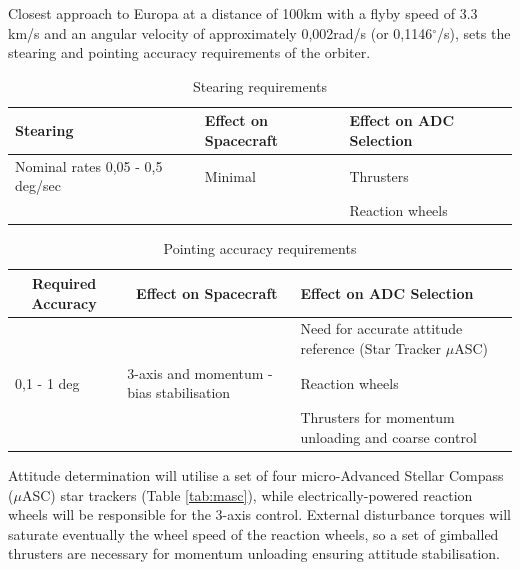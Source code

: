 Closest approach to Europa at a distance of 100km with a flyby speed of 3.3 km/s and an angular velocity of approximately 0,002rad/s (or 0,1146$^{\circ}$/s), sets the stearing and pointing accuracy requirements of the orbiter. 
\begin{table}[htb]
  \centering
    \begin{tabular}{|p{}|p{}|p{}|}
    \hline
    \textbf{Stearing} & \textbf{Effect on Spacecraft} & \textbf{Effect on ADC Selection} \bigstrut\\
    \hline
    Nominal rates 0,05 - 0,5 deg/sec & Minimal & Thrusters \bigstrut\\
\cline{3-3}          &       & Reaction wheels \bigstrut\\
    \hline
    \end{tabular}%
    \caption{Stearing requirements \cite {spacemissionanalysis}}
  \label{tab:stearing_req}%
\end{table}%

\begin{table}[htb]
  \centering
    \begin{tabular}{|p{}|p{}|p{}|}
    \hline
    \multicolumn{1}{|c|}{\textbf{Required Accuracy}} & \multicolumn{1}{c|}{\textbf{Effect on Spacecraft}} & \textbf{Effect on ADC Selection} \bigstrut\\
    \hline
          &       & Need for accurate attitude reference (Star Tracker $\mu$ASC) \bigstrut\\
\cline{3-3}    0,1 - 1 deg & 3-axis and momentum - bias stabilisation & Reaction wheels \bigstrut\\
\cline{3-3}          &       & Thrusters for momentum unloading and coarse control \bigstrut\\
    \hline
    \end{tabular}%
    \caption{Pointing accuracy requirements \cite {spacemissionanalysis}}
  \label{tab:point_acc_req}%
\end{table}%
Attitude determination will utilise a set of four micro-Advanced Stellar Compass ($\mu$ASC) star trackers (Table \ref{tab:masc}), while electrically-powered reaction wheels will be responsible for the 3-axis control. External disturbance torques will saturate eventually the wheel speed of the reaction wheels, so a set of gimballed thrusters are necessary for  momentum unloading ensuring attitude stabilisation.

